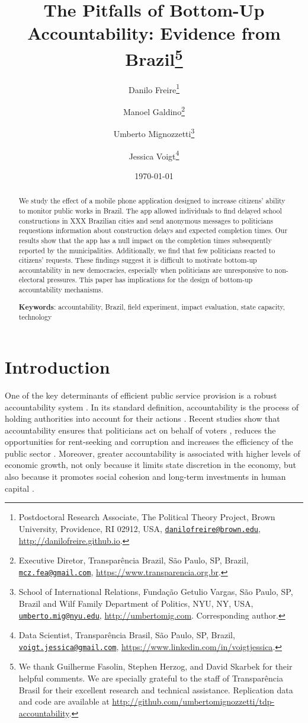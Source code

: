 \documentclass[12pt,a4paper,]{article}
\title{The Pitfalls of Bottom-Up Accountability: Evidence from Brazil\thanks{We thank Guilherme Fasolin, Stephen Herzog, and David Skarbek for their
helpful comments. We are specially grateful to the staff of
Transparência Brasil for their excellent research and technical
assistance. Replication data and code are available at
\url{http://github.com/umbertomignozzetti/tdp-accountability}.}}
\author{Danilo Freire\footnote{Postdoctoral Research Associate, The Political
  Theory Project, Brown University, Providence, RI 02912, USA,
  \href{mailto:danilofreire@brown.edu}{\nolinkurl{danilofreire@brown.edu}},
  \url{http://danilofreire.github.io}.} \and Manoel Galdino\footnote{Executive Diretor, Transparência Brazil, São
  Paulo, SP, Brazil,
  \href{mailto:mcz.fea@gmail.com}{\nolinkurl{mcz.fea@gmail.com}},
  \url{https://www.transparencia.org.br}.} \and Umberto Mignozzetti\footnote{School of International Relations, Fundação
  Getulio Vargas, São Paulo, SP, Brazil and Wilf Family Department of
  Politics, NYU, NY, USA,
  \href{mailto:umberto.mig@nyu.edu}{\nolinkurl{umberto.mig@nyu.edu}},
  \url{http://umbertomig.com}. Corresponding author.} \and Jessica Voigt\footnote{Data Scientist, Transparência Brasil, São Paulo,
  SP, Brazil,
  \href{mailto:voigt.jessica@gmail.com}{\nolinkurl{voigt.jessica@gmail.com}},
  \url{https://www.linkedin.com/in/voigtjessica}.}}
\date{\today}
\begin{document}
\maketitle

\begin{abstract}
\doublespacing \noindent We study the effect of a mobile phone application designed to increase
citizens' ability to monitor public works in Brazil. The app allowed
individuals to find delayed school constructions in XXX Brazilian cities
and send anonymous messages to politicians requestions information about
construction delays and expected completion times. Our results show that
the app has a null impact on the completion times subsequently reported
by the municipalities. Additionally, we find that few politicians
reacted to citizens' requests. These findings suggest it is difficult to
motivate bottom-up accountability in new democracies, especially when
politicians are unresponsive to non-electoral pressures. This paper has
implications for the design of bottom-up accountability mechanisms.
\vspace{.25cm}

\noindent \textbf{Keywords}: accountability, Brazil, field experiment, impact evaluation, state
capacity, technology
\vspace{.25cm}

\end{abstract}


\newpage

\hypertarget{introduction}{%
\section{\texorpdfstring{Introduction\label{sec:intro}}{Introduction}}\label{introduction}}

One of the key determinants of efficient public service provision is a
robust accountability system
\citep{besley2003incentives,cameron2004public,o1998horizontal}. In its
standard definition, accountability is the process of holding
authorities into account for their actions
\citep{finer1941administrative,mulgan2000accountability,o1990bureaucratic}.
Recent studies show that accountability ensures that politicians act on
behalf of voters \citep{freire2010ngp, moncrieffe1998reconceptualizing},
reduces the opportunities for rent-seeking and corruption
\citep{deininger2005does,wenar2006accountability} and increases the
efficiency of the public sector \citep{adsera2003you,bjorkman2009power}.
Moreover, greater accountability is associated with higher levels of
economic growth, not only because it limits state discretion in the
economy, but also because it promotes social cohesion and long-term
investments in human capital
\citep{benhabib2010economic, cox2018executive, suebvises2018social,ponzetto2018social}.
\end{document}
